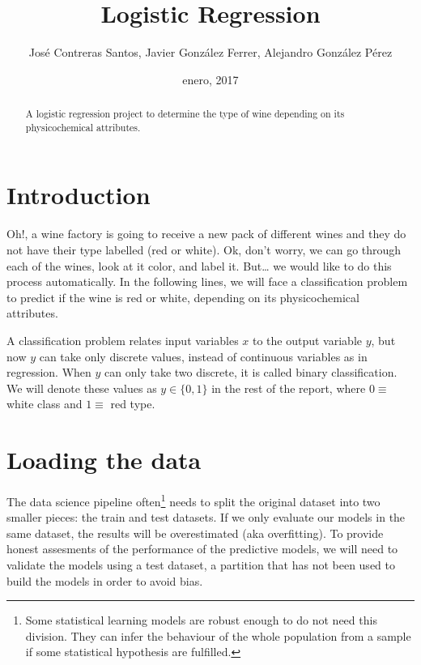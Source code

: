 \documentclass[12pt,]{article}
\title{Logistic Regression}
\author{José Contreras Santos, Javier González Ferrer, Alejandro González Pérez}
\date{enero, 2017}
\let\rmarkdownfootnote\footnote%
\def\footnote{\protect\rmarkdownfootnote}
\begin{document}
\maketitle
\begin{abstract}
A logistic regression project to determine the type of wine depending on
its physicochemical attributes.
\end{abstract}

\section{Introduction}\label{introduction}

Oh!, a wine factory is going to receive a new pack of different wines
and they do not have their type labelled (red or white). Ok, don't
worry, we can go through each of the wines, look at it color, and label
it. But\ldots{} we would like to do this process automatically. In the
following lines, we will face a classification problem to predict if the
wine is red or white, depending on its physicochemical attributes.

A classification problem relates input variables \(x\) to the output
variable \(y\), but now \(y\) can take only discrete values, instead of
continuous variables as in regression. When \(y\) can only take two
discrete, it is called binary classification. We will denote these
values as \(y \in \{0, 1\}\) in the rest of the report, where
\(0 \equiv\) white class and \(1 \equiv\) red type.

\section{Loading the data}\label{loading-the-data}

The data science pipeline often\footnote{Some statistical learning
  models are robust enough to do not need this division. They can infer
  the behaviour of the whole population from a sample if some
  statistical hypothesis are fulfilled.} needs to split the original
dataset into two smaller pieces: the train and test datasets. If we only
evaluate our models in the same dataset, the results will be
overestimated (aka overfitting). To provide honest assesments of the
performance of the predictive models, we will need to validate the
models using a test dataset, a partition that has not been used to build
the models in order to avoid bias.
\end{document}
